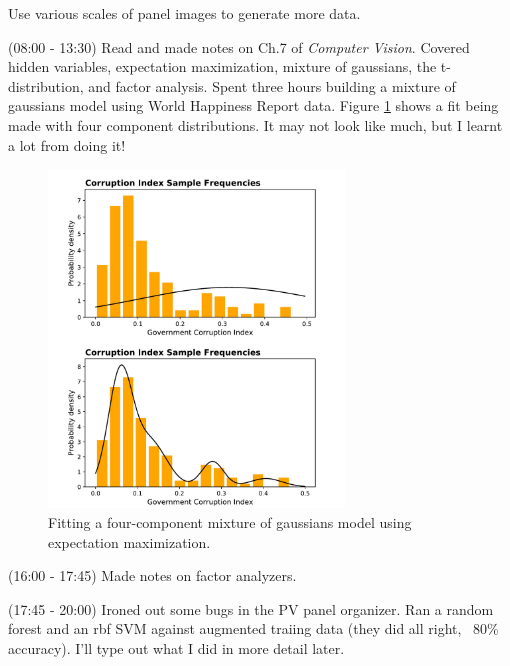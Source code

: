 \documentclass[idxtotoc,hyperref,openany]{labbook} %
\begin{document}
 Use various scales of panel images to generate more data. 
 
 
 
 
 (08:00 - 13:30) Read and made notes on Ch.7 of \emph{Computer Vision}. Covered hidden variables, expectation maximization, mixture of gaussians, the t-distribution, and factor analysis. Spent three hours building a mixture of gaussians model using World Happiness Report data. Figure \ref{fig:MoG} shows a fit being made with four component distributions. It may not look like much, but I learnt a lot from doing it!
\begin{figure}[h!]
\centering
\includegraphics[width=0.7\textwidth]{MoG.pdf}
\caption{Fitting a four-component mixture of gaussians model using expectation maximization.}
\label{fig:MoG}
\end{figure}
 (16:00 - 17:45) Made notes on factor analyzers.
 
 (17:45 - 20:00) Ironed out some bugs in the PV panel organizer. Ran a random forest and an rbf SVM against augmented traiing data (they did all right, ~80\% accuracy). I'll type out what I did in more detail later.
 
\end{document}
